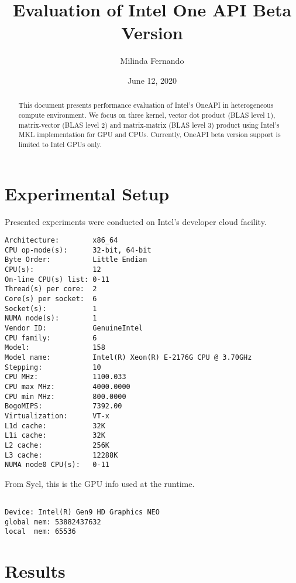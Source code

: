 \documentclass[]{report}   %
\begin{document}
\title{Evaluation of Intel One API Beta Version}   %
\author{Milinda Fernando}         %
\date{June 12, 2020}    %
\maketitle

\begin{abstract}
  This document presents performance evaluation of Intel's OneAPI in heterogeneous compute environment. We focus on three kernel, vector dot product (BLAS level 1), matrix-vector (BLAS level 2) and matrix-matrix (BLAS level 3) product using Intel's MKL implementation for GPU and CPUs. Currently, OneAPI beta version support is limited to Intel GPUs only. 
\end{abstract}

\section{Experimental Setup}
Presented experiments were conducted on Intel's developer cloud facility. 


\begin{verbatim}
Architecture:        x86_64
CPU op-mode(s):      32-bit, 64-bit
Byte Order:          Little Endian
CPU(s):              12
On-line CPU(s) list: 0-11
Thread(s) per core:  2
Core(s) per socket:  6
Socket(s):           1
NUMA node(s):        1
Vendor ID:           GenuineIntel
CPU family:          6
Model:               158
Model name:          Intel(R) Xeon(R) E-2176G CPU @ 3.70GHz
Stepping:            10
CPU MHz:             1100.033
CPU max MHz:         4000.0000
CPU min MHz:         800.0000
BogoMIPS:            7392.00
Virtualization:      VT-x
L1d cache:           32K
L1i cache:           32K
L2 cache:            256K
L3 cache:            12288K
NUMA node0 CPU(s):   0-11
\end{verbatim}  

From Sycl, this is the GPU info used at the runtime. 

\begin{verbatim}

Device: Intel(R) Gen9 HD Graphics NEO
global mem: 53882437632
local  mem: 65536

\end{verbatim}

\newpage
\section{Results}
\end{document}

